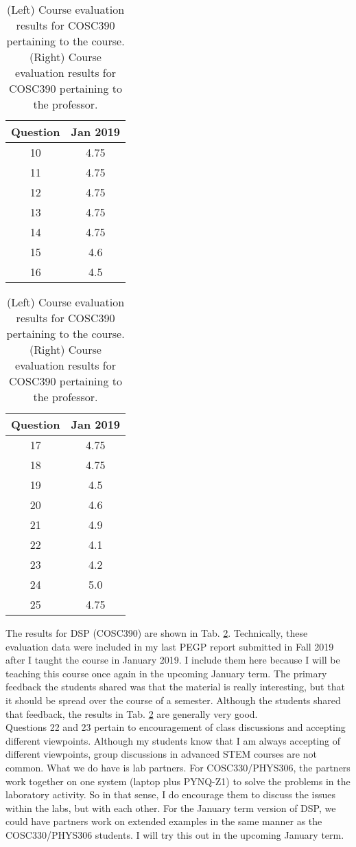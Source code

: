 \documentclass[../../main.tex]{subfiles}
\begin{document}
\begin{table}
\footnotesize
\centering
\begin{tabular}{| c | c |}
\hline
\hline
Question & Jan 2019 \\ \hline
10 & 4.75 \\ \hline
11 & 4.75 \\ \hline
12 & 4.75 \\ \hline
13 & 4.75 \\ \hline
14 & 4.75 \\ \hline
15 & 4.6 \\ \hline
16 & 4.5 \\ \hline
\hline
\end{tabular}
\begin{tabular}{| c | c |}
\hline
\hline
Question & Jan 2019 \\ \hline
17 & 4.75 \\ \hline
18 & 4.75 \\ \hline
19 & 4.5 \\ \hline
20 & 4.6 \\ \hline
21 & 4.9 \\ \hline
22 & 4.1 \\ \hline
23 & 4.2 \\ \hline
24 & 5.0 \\ \hline
25 & 4.75 \\ \hline
\hline
\end{tabular}
\caption{\label{tab:eval_dsp} (Left) Course evaluation results for COSC390 pertaining to the course.  (Right) Course evaluation results for COSC390 pertaining to the professor.}
\end{table}

The results for DSP (COSC390) are shown in Tab. \ref{tab:eval_dsp}.  Technically, these evaluation data were included in my last PEGP report submitted in Fall 2019 after I taught the course in January 2019.  I include them here because I will be teaching this course once again in the upcoming January term.  The primary feedback the students shared was that the material is really interesting, but that it should be spread over the course of a semester.  Although the students shared that feedback, the results in Tab. \ref{tab:eval_dsp} are generally very good.
\\
\vspace{0.15cm}
Questions 22 and 23 pertain to encouragement of class discussions and accepting different viewpoints.  Although my students know that I am always accepting of different viewpoints, group discussions in advanced STEM courses are not common.  What we do have is lab partners. For COSC330/PHYS306, the partners work together on one system (laptop plus PYNQ-Z1) to solve the problems in the laboratory activity.  So in that sense, I do encourage them to discuss the issues within the labs, but with each other.  For the January term version of DSP, we could have partners work on extended examples in the same manner as the COSC330/PHYS306 students.  I will try this out in the upcoming January term.
\end{document}
